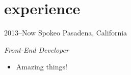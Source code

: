 \documentclass[]{friggeri-cv} %
\begin{document}

\section{experience}

\begin{entrylist}

\entry
{2013--Now}
{Spokeo}
{Pasadena, California}
{\emph{Front-End Developer}
\begin{itemize}
\item Amazing things!
\end{itemize}}


\end{entrylist}
\end{document}

